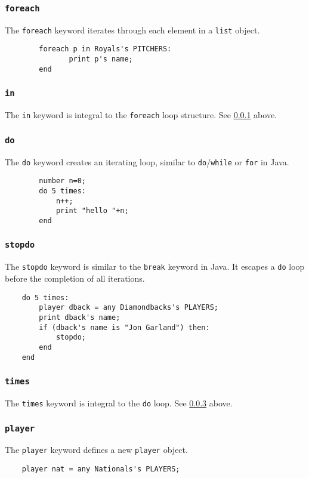\subsubsection{\texttt{foreach}} \label{foreach}
The \texttt{foreach} keyword iterates through each element in a \texttt{list} object. 
\begin{verbatim}
        foreach p in Royals's PITCHERS: 
               print p's name;
        end
\end{verbatim}

\subsubsection{\texttt{in}}
The \texttt{in} keyword is integral to the \texttt{foreach} loop structure. See \ref{foreach} above.

\subsubsection{\texttt{do}} \label{do}
The \texttt{do} keyword creates an iterating loop, similar to \texttt{do}/\texttt{while} or \texttt{for} in Java.
\begin{verbatim}
        number n=0;
        do 5 times:
            n++;
            print "hello "+n;
        end
\end{verbatim}

\subsubsection{\texttt{stopdo}} \label{stopdo}
The \texttt{stopdo} keyword is similar to the \texttt{break} keyword in Java. It escapes a \texttt{do} loop before the completion of all iterations.
\begin{verbatim}
    do 5 times:
        player dback = any Diamondbacks's PLAYERS;
        print dback's name;
        if (dback's name is "Jon Garland") then:
            stopdo;
        end
    end
\end{verbatim}

\subsubsection{\texttt{times}}
The \texttt{times} keyword is integral to the \texttt{do} loop. See \ref{do} above.

\subsubsection{\texttt{player}}
The \texttt{player} keyword defines a new \texttt{player} object.
\begin{verbatim}
    player nat = any Nationals's PLAYERS;
\end{verbatim}

